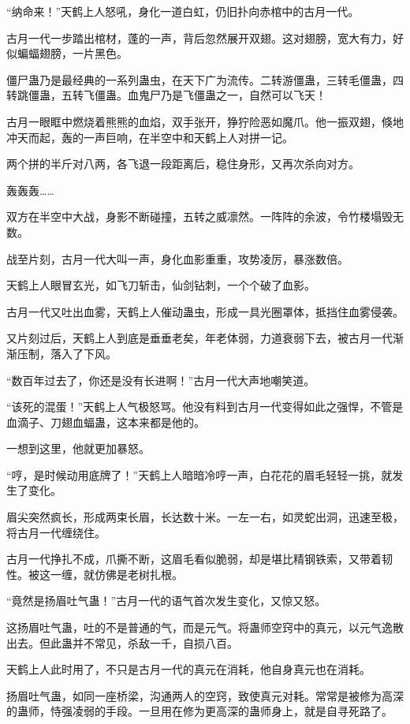 \begin{this_body}
“纳命来！”天鹤上人怒吼，身化一道白虹，仍旧扑向赤棺中的古月一代。

古月一代一步踏出棺材，蓬的一声，背后忽然展开双翅。这对翅膀，宽大有力，好似蝙蝠翅膀，一片黑色。

僵尸蛊乃是最经典的一系列蛊虫，在天下广为流传。二转游僵蛊，三转毛僵蛊，四转跳僵蛊，五转飞僵蛊。血鬼尸乃是飞僵蛊之一，自然可以飞天！

古月一眼眶中燃烧着熊熊的血焰，双手张开，狰狞险恶如魔爪。他一振双翅，倏地冲天而起，轰的一声巨响，在半空中和天鹤上人对拼一记。

两个拼的半斤对八两，各飞退一段距离后，稳住身形，又再次杀向对方。

轰轰轰……

双方在半空中大战，身影不断碰撞，五转之威凛然。一阵阵的余波，令竹楼塌毁无数。

战至片刻，古月一代大叫一声，身化血影重重，攻势凌厉，暴涨数倍。

天鹤上人眼冒玄光，如飞刀斩击，仙剑钻刺，一个个破了血影。

古月一代又吐出血雾，天鹤上人催动蛊虫，形成一具光圈罩体，抵挡住血雾侵袭。

又片刻过后，天鹤上人到底是垂垂老矣，年老体弱，力道衰弱下去，被古月一代渐渐压制，落入了下风。

“数百年过去了，你还是没有长进啊！”古月一代大声地嘲笑道。

“该死的混蛋！”天鹤上人气极怒骂。他没有料到古月一代变得如此之强悍，不管是血滴子、刀翅血蝠蛊，这本来都是他的。

一想到这里，他就更加暴怒。

“哼，是时候动用底牌了！”天鹤上人暗暗冷哼一声，白花花的眉毛轻轻一挑，就发生了变化。

眉尖突然疯长，形成两束长眉，长达数十米。一左一右，如灵蛇出洞，迅速至极，将古月一代缠绕住。

古月一代挣扎不成，爪撕不断，这眉毛看似脆弱，却是堪比精钢铁索，又带着韧性。被这一缠，就仿佛是老树扎根。

“竟然是扬眉吐气蛊！”古月一代的语气首次发生变化，又惊又怒。

这扬眉吐气蛊，吐的不是普通的气，而是元气。将蛊师空窍中的真元，以元气逸散出去。但此蛊并不常见，杀敌一千，自损八百。

天鹤上人此时用了，不只是古月一代的真元在消耗，他自身真元也在消耗。

扬眉吐气蛊，如同一座桥梁，沟通两人的空窍，致使真元对耗。常常是被修为高深的蛊师，恃强凌弱的手段。一旦用在修为更高深的蛊师身上，就是自寻死路了。


\end{this_body}
